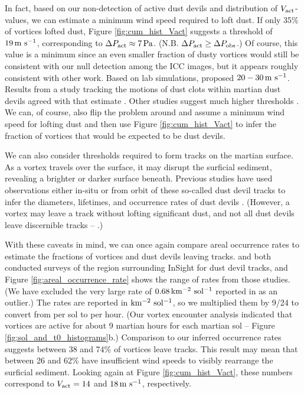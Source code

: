 \documentclass[linenumbers,trackchanges]{aastex63}
\begin{document}

In fact, based on our non-detection of active dust devils and distribution of $V_{\rm act}$-values, we can estimate a minimum wind speed required to loft dust. If only 35\% of vortices lofted dust, Figure \ref{fig:cum_hist_Vact} suggests a threshold of $19\,{\rm m\ s^{-1}}$, corresponding to $\Delta P_{\rm act} \approx 7\,{\rm Pa}$. (N.B. $\Delta P_{\rm act} \geq \Delta P_{\rm obs}$.) Of course, this value is a minimum since an even smaller fraction of dusty vortices would still be consistent with our null detection among the ICC images, but it appears roughly consistent with other work. Based on lab simulations, \citet{2003JGRE..108.5041G} proposed $20-30\,{\rm m\ s^{-1}}$. Results from a study tracking the motions of dust clots within martian dust devils agreed with that estimate \citep{2011GeoRL..3824206C}. Other studies suggest much higher thresholds \citep[cf.][]{2006JGRE..11112002C}. We can, of course, also flip the problem around and assume a minimum wind speed for lofting dust and then use Figure \ref{fig:cum_hist_Vact} to infer the fraction of vortices that would be expected to be dust devils.

We can also consider thresholds required to form tracks on the martian surface. As a vortex travels over the surface, it may disrupt the surficial sediment, revealing a brighter or darker surface beneath. Previous studies have used observations either in-situ or from orbit of these so-called dust devil tracks to infer the diameters, lifetimes, and occurrence rates of dust devils \citep[e.g.,][]{2008JGRE..113.7002W}. (However, a vortex may leave a track without lofting significant dust, and not all dust devils leave discernible tracks -- \citealp{2005JGRE..110.6002G}.) 

With these caveats in mind, we can once again compare areal occurrence rates to estimate the fractions of vortices and dust devils leaving tracks. \citet{2016Icar..266..315R} and \citet{2020GeoRL..4787234P} both conducted surveys of the region surrounding InSight for dust devil tracks, and Figure \ref{fig:areal_occurrence_rate} shows the range of rates from those studies. (We have excluded the very large rate of $0.68\,{\rm km^{-2}\ sol^{-1}}$ reported in \citet{2020GeoRL..4787234P} as an outlier.) The rates are reported in ${\rm km^{-2}\ sol^{-1}}$, so we multiplied them by 9/24 to convert from per sol to per hour. (Our vortex encounter analysis indicated that vortices are active for about 9 martian hours for each martian sol -- Figure \ref{fig:sol_and_t0_histograms}b.) Comparison to our inferred occurrence rates suggests between 38 and 74\% of vortices leave tracks. This result may mean that between 26 and 62\% have insufficient wind speeds to visibly rearrange the surficial sediment. Looking again at Figure \ref{fig:cum_hist_Vact}, these numbers correspond to $V_{\rm act} = 14$ and $18\,{\rm m\ s^{-1}}$, respectively. 
\end{document}
